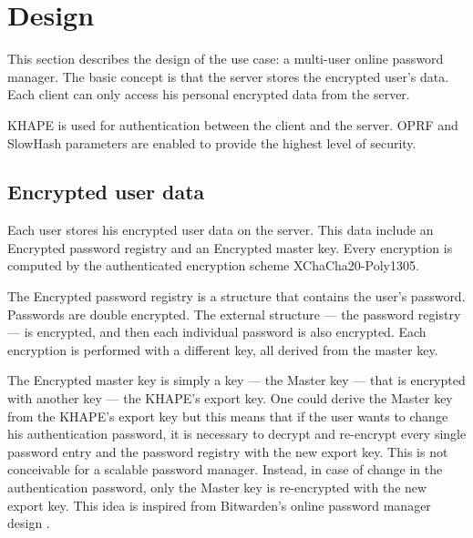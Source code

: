 \documentclass[../report.tex]{subfiles}
\begin{document}

\section{Design}
This section describes the design of the use case: a multi-user online password manager.
The basic concept is that the server stores the encrypted user's data. 
Each client can only access his personal encrypted data from the server.

KHAPE is used for authentication between the client and the server. OPRF and SlowHash parameters are enabled to provide the highest level of security.



\subsection{Encrypted user data}
Each user stores his encrypted user data on the server. This data include an Encrypted password registry and an Encrypted master key. Every encryption is computed by the authenticated encryption scheme XChaCha20-Poly1305.

The Encrypted password registry is a structure that contains the user's password. Passwords are double encrypted. The external structure --- the password registry --- is encrypted, and then each individual password is also encrypted. Each encryption is performed with a different key, all derived from the master key.

The Encrypted master key is simply a key --- the Master key --- that is encrypted with another key --- the KHAPE's export key. 
One could derive the Master key from the KHAPE's export key but this means that if the user wants to change his authentication password, it is necessary to decrypt and re-encrypt every single password entry and the password registry with the new export key. This is not conceivable for a scalable password manager. Instead, in case of change in the authentication password, only the Master key is re-encrypted with the new export key. This idea is inspired from Bitwarden's online password manager design \cite{Bitwarden_Paper}.

% 
% 
% 
% 
\end{document}
